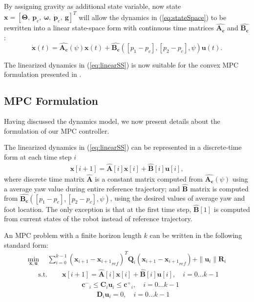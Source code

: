 By assigning gravity as additional state variable, now state ${{\bm x}} = [{{\bm \Theta}},\: {\bm p}_c,\:{{\bm \omega}},\:\dot { {\bm p}}_c,\:\bm g]^T$ will allow the dynamics in (\ref{eq:stateSpace}) to be rewritten into a linear state-space form with continuous time matrices $\bm {\hat{A_c}}$ and $\bm {\hat{B_c}}$: 
\begin{equation}
\label{eq:linearSS}
\dot{{\bm { x}}}(t) = \bm {\hat{A_c}}(\psi) {{\bm {x}}}(t) + \bm {\hat{B_c}}([p_1-p_c],[p_2-p_c],\psi) \bm u(t).
\end{equation}

The linearized dynamics in (\ref{eq:linearSS}) is now suitable for the convex MPC formulation presented in \cite{di2018dynamic}.

\subsection{MPC Formulation}
\label{subsec:MPC}
Having discussed the dynamics model, we now present details about the formulation of our MPC controller.

The linearized dynamics in (\ref{eq:linearSS}) can be represented in a discrete-time form at each time step $i$
\begin{align}
\label{eq:discreteDynamics}
{\bm {x}}[i+1] = \bm {\hat{A}}[i] \bm x[i] + \bm {\hat{B}}[i]\bm u[i],
\end{align}
where discrete time matrix $\bm {\hat{A}}$ is a constant matrix computed from $\bm {\hat{A_c}}(\psi)$ using a average yaw value during entire reference trajectory; and $\bm {\hat{B}}$ matrix is computed from $ \bm{\hat{B_c}}([p_1-p_c],[p_2-p_c],\psi)$, using the desired values of average yaw and foot location. The only exception is that at the first time step,  $\bm {\hat{B}}[1]$ is computed from current states of the robot instead of reference trajectory.

An MPC problem with a finite horizon length $k$ can be written in the following standard form:
\begin{align}
\label{eq:MPCform}
\underset{\bm{x,u}}{\operatorname{min}}   \:\:  & \sum_{i = 0}^{k-1}(\bm x_{i+1}-  {\bm x_{i+1}}_{ref})^T\bm Q_i(\bm x_{i+1}- {\bm x_{i+1}}_{ref}) + \| \bm{u}_i \|\bm{R}_i
\end{align}
\begin{align}
\label{eq:dynamicCons}
\:\:\mbox{s.t. }& \quad  {\bm {x}}[i+1] = \bm {\hat{A}}[i]\bm x[i] + \bm {\hat{B}}[i]\bm u[i], \quad i = 0 \dots k-1
\end{align}
\begin{align}
\label{eq:MPCineqCons}
\quad  \bm {c^-}_i \leq \bm C_i\bm u_i \leq \bm {c^+}_i, \quad i = 0 \dots k-1
\end{align}
\begin{align}
\label{eq:MPCeqCons}
& \quad \bm D_i \bm u_i = 0 , \quad i = 0 \dots k-1
\end{align}

